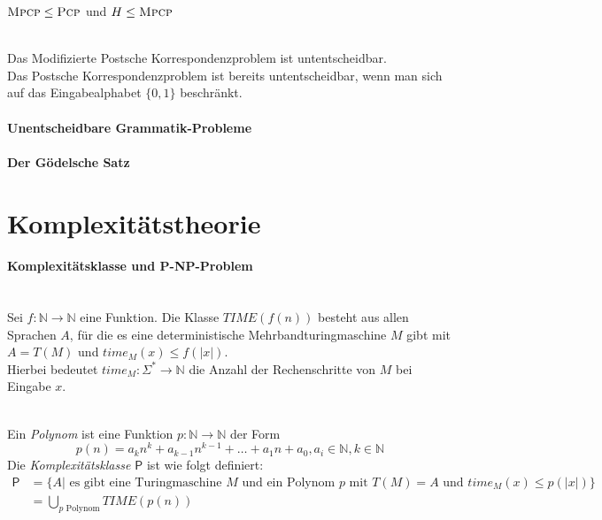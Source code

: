 \documentclass{scrartcl}
\begin{document}
$\textsc{Mpcp} \leq \textsc{Pcp}$ und $H\leq \textsc{Mpcp} $

\begin{shaded}
\ \\
    Das Modifizierte Postsche Korrespondenzproblem ist untentscheidbar.\\[.5cm]
    Das Postsche Korrespondenzproblem ist bereits untentscheidbar, wenn man sich auf das Eingabealphabet $\{0,1\}$ beschränkt.
\end{shaded}

\subsection*{Unentscheidbare Grammatik-Probleme}
\subsection*{Der Gödelsche Satz}

\part*{Komplexitätstheorie}
\subsection*{Komplexitätsklasse und P-NP-Problem}
\begin{shaded}
    \ \\Sei $f:\mathds{N}\to \mathds{N}$ eine Funktion. Die Klasse $TIME(f(n))$ besteht aus allen Sprachen $A$, für die es eine deterministische Mehrbandturingmaschine $M$ gibt mit $A=T(M)$ und $time_M(x)\leq f(|x|)$.\\
    Hierbei bedeutet $time_M:\Sigma^*\to \mathds{N}$ die Anzahl der Rechenschritte von $M$ bei Eingabe $x$.
\end{shaded}

\begin{shaded}
    \ \\Ein \emph{Polynom} ist eine Funktion $p:\mathds{N}\to \mathds{N} $ der Form \[ p(n)=a_kn^k+a_{k-1}n^{k-1}+\dots+a_1n+a_0, a_i\in \mathds{N}, k\in \mathds{N} \]
    Die \emph{Komplexitätsklasse $\mathsf{P}$} ist wie folgt definiert:
    \begin{align*}
        \mathsf{P} &= \{A | \textrm{ es gibt eine Turingmaschine } M \textrm{ und ein Polynom } p \textrm{ mit } T(M)=A \textrm{ und } time_M(x)\leq p(|x|) \} \\
        &= \underset{p \textrm{ Polynom}}{\bigcup} TIME(p(n))
    \end{align*}
\end{shaded}
\end{document}
